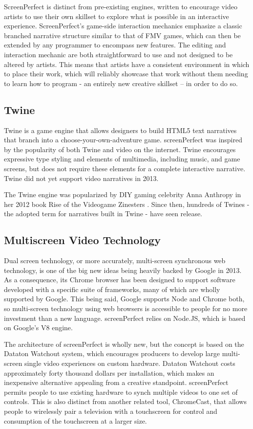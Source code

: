 ScreenPerfect is distinct from pre-existing engines, written to encourage video artists to use their own skillset to explore what is possible in an interactive experience. ScreenPerfect's game-side interaction mechanics emphasize a classic branched narrative structure similar to that of FMV games, which can then be extended by any programmer to encompass new features. The editing and interaction mechanic are both straightforward to use and not designed to be altered by artists. This means that artists have a consistent environment in which to place their work, which will reliably showcase that work without them needing to learn how to program - an entirely new creative skillset – in order to do so.

\subsection{Twine}
Twine is a game engine that allows designers to build HTML5 text narratives that branch into a choose-your-own-adventure game. screenPerfect was inspired by the popularity of both Twine and video on the internet. Twine encourages expressive type styling and elements of multimedia, including music, and game screens, but does not require these elements for a complete interactive narrative. Twine did not yet support video narratives in 2013.

The Twine engine was popularized by DIY gaming celebrity Anna Anthropy in her 2012 book Rise of the Videogame Zinesters \parencite{anthropy}. Since then, hundreds of Twines - the adopted term for narratives built in Twine - have seen release.

\subsection{Multiscreen Video Technology}
Dual screen technology, or more accurately, multi-screen synchronous web technology, is one of the big new ideas being heavily backed by Google in 2013. As a consequence, its Chrome browser has been designed to support software developed with a specific suite of frameworks, many of which are wholly supported by Google. 
This being said, Google supports Node and Chrome both, so multi-screen technology using web browsers is accessible to people for no more investment than a new language. screenPerfect relies on Node.JS, which is based on Google's V8 engine.

The architecture of screenPerfect is wholly new, but the concept is based on the Dataton Watchout system, which encourages producers to develop large multi-screen single video experiences on custom hardware. Dataton Watchout costs approximately forty thousand dollars per installation, which makes an inexpensive alternative appealing from a creative standpoint. screenPerfect permits people to use existing hardware to synch multiple videos to one set of controls. This is also distinct from another related tool, ChromeCast, that allows people to wirelessly pair a television with a touchscreen for control and consumption of the touchscreen at a larger size.

